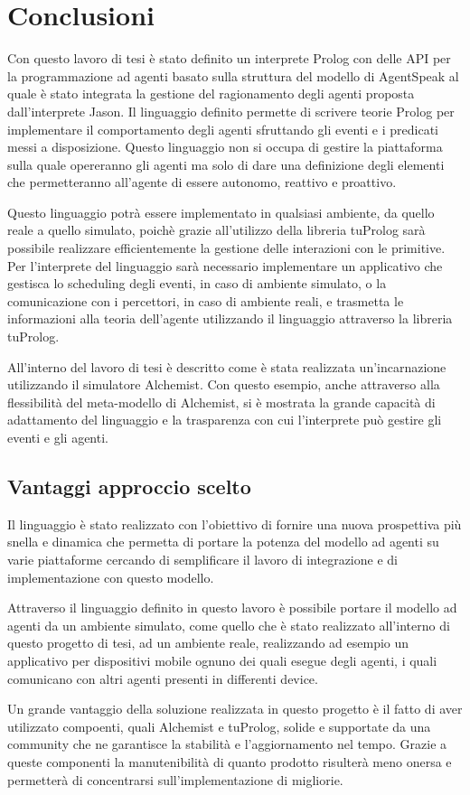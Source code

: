 \chapter{Conclusioni}\label{chap:conclusions}
Con questo lavoro di tesi è stato definito un interprete Prolog con delle API per la programmazione ad agenti basato sulla struttura del modello di AgentSpeak al quale è stato integrata la gestione del ragionamento degli agenti proposta dall'interprete Jason.
%
Il linguaggio definito permette di scrivere teorie Prolog per implementare il comportamento degli agenti sfruttando gli eventi e i predicati messi a disposizione.
Questo linguaggio non si occupa di gestire la piattaforma sulla quale opereranno gli agenti ma solo di dare una definizione degli elementi che permetteranno all'agente di essere autonomo, reattivo e proattivo.

Questo linguaggio potrà essere implementato in qualsiasi ambiente, da quello reale a quello simulato, poichè grazie all'utilizzo della libreria tuProlog sarà possibile realizzare efficientemente la gestione delle interazioni con le primitive.
%
Per l'interprete del linguaggio sarà necessario implementare un applicativo che gestisca lo scheduling degli eventi, in caso di ambiente simulato, o la comunicazione con i percettori, in caso di ambiente reali, e trasmetta le informazioni alla teoria dell'agente utilizzando il linguaggio attraverso la libreria tuProlog.

All'interno del lavoro di tesi è descritto come è stata realizzata un'incarnazione utilizzando il simulatore Alchemist.
Con questo esempio, anche attraverso alla flessibilità del meta-modello di Alchemist, si è mostrata la grande capacità di adattamento del linguaggio e la trasparenza con cui l'interprete può gestire gli eventi e gli agenti.

\section{Vantaggi approccio scelto}
Il linguaggio è stato realizzato con l'obiettivo di fornire una nuova prospettiva più snella e dinamica che permetta di portare la potenza del modello ad agenti su varie piattaforme cercando di semplificare il lavoro di integrazione e di implementazione con questo modello.

Attraverso il linguaggio definito in questo lavoro è possibile portare il modello ad agenti da un ambiente simulato, come quello che è stato realizzato all'interno di questo progetto di tesi, ad un ambiente reale, realizzando ad esempio un applicativo per dispositivi mobile ognuno dei quali esegue degli agenti, i quali comunicano con altri agenti presenti in differenti device.

Un grande vantaggio della soluzione realizzata in questo progetto è il fatto di aver utilizzato compoenti, quali Alchemist e tuProlog, solide e supportate da una community che ne garantisce la stabilità e l'aggiornamento nel tempo.
Grazie a queste componenti la manutenibilità di quanto prodotto risulterà meno onersa e permetterà di concentrarsi sull'implementazione di migliorie.
